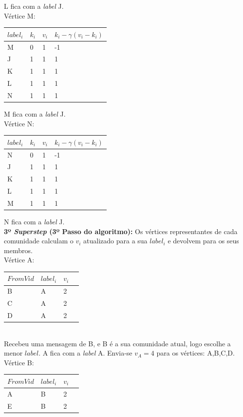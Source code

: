 \documentclass[a4paper,10pt]{report}
\begin{document}
  L fica com a \textit{label} J.
\\[0.25cm]
Vértice M:
  \begin{tabular}{| l | l | l | l |}
  \hline
  $label_i$ & $k_i$ & $v_i$ & $k_i - \gamma(v_i - k_i)$\\ \hline
  M & 0 & 1 & -1 \\ \hline
  J & 1 & 1 & 1  \\ \hline
  K & 1 & 1 & 1  \\ \hline
  L & 1 & 1 & 1  \\ \hline
  N & 1 & 1 & 1  \\ \hline
  \end{tabular}  
  M fica com a \textit{label} J.
\\[0.25cm]
Vértice N:
  \begin{tabular}{| l | l | l | l |}
  \hline
  $label_i$ & $k_i$ & $v_i$ & $k_i - \gamma(v_i - k_i)$\\ \hline
  N & 0 & 1 & -1 \\ \hline
  J & 1 & 1 & 1  \\ \hline
  K & 1 & 1 & 1  \\ \hline
  L & 1 & 1 & 1  \\ \hline
  M & 1 & 1 & 1  \\ \hline
  \end{tabular}  
  N fica com a \textit{label} J.
\\[0.25cm]
{\bf 3º \textit{Superstep} (3º Passo do algoritmo):} Os vértices representantes 
de cada comunidade calculam o $v_i$ atualizado para a sua $label_i$ e devolvem 
para os seus membros.
\\[0.25cm]
Vértice A:
  \begin{tabular}{| l | l | l | l |}
  \hline
  $From Vid$ & $label_i$ & $v_i$ \\ \hline
  B & A & 2 \\ \hline
  C & A & 2 \\ \hline
  D & A & 2 \\ \hline
  \end{tabular} 
\\[0.25cm]
  Recebeu uma mensagem de B, e B é a sua comunidade atual, logo escolhe a menor 
$label$. A fica com a \textit{label} A.
  Envia-se $v_A=4$ para os vértices: A,B,C,D.
\\[0.25cm]
Vértice B:
  \begin{tabular}{| l | l | l | l |}
  \hline
  $From Vid$ & $label_i$ & $v_i$ \\ \hline
  A & B & 2 \\ \hline
  E & B & 2 \\ \hline
  \end{tabular}  
\end{document}
